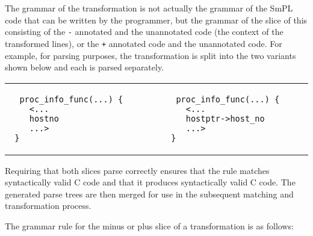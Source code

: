 \documentclass{article}
\newcommand{\sizecodebis}[0]{\scriptsize}
\begin{document}
The grammar of the transformation is not actually the grammar of the SmPL
code that can be written by the programmer, but the grammar of the slice of
this consisting of the {\tt -} annotated and the unannotated code (the
context of the transformed lines), or the {\tt +} annotated code and the
unannotated code.  For example, for parsing purposes, the transformation
is split into the two variants shown below and each is parsed
separately.


{%
\begin{center}
\begin{tabular}{p{3cm}p{5cm}p{3cm}}
\begin{verbatim}
  proc_info_func(...) {        
    <...
    hostno
    ...>
 }
\end{verbatim}
&&
\begin{verbatim}
  proc_info_func(...) {        
    <...
    hostptr->host_no
    ...>
 }
\end{verbatim}
\end{tabular}
\end{center}
}

\noindent
Requiring that both slices parse correctly ensures that the rule matches
syntactically valid C code and that it produces syntactically valid C code.
The generated parse trees are then merged for use in the subsequent
matching and transformation process.

The grammar rule for the minus or plus slice of a transformation is as follows:

\begin{grammar}

  \CASE{}

\end{grammar}
\end{document}
